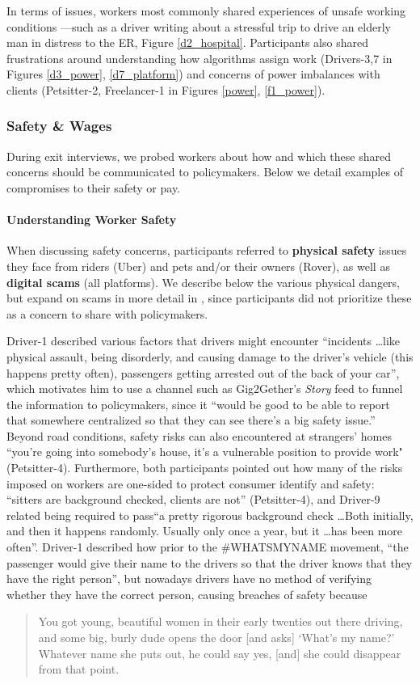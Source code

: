 In terms of issues, workers most commonly shared experiences of unsafe working conditions ---such as a driver writing about a stressful trip to drive an elderly man in distress to the ER, Figure \ref{d2_hospital}. 
Participants also shared frustrations around understanding how algorithms assign work (Drivers-3,7 in Figures \ref{d3_power}, \ref{d7_platform}) and concerns of power imbalances with clients (Petsitter-2, Freelancer-1 in Figures \ref{power}, \ref{f1_power}).

\subsubsection{{Safety \& Wages}} 

{During exit interviews, we probed workers about how and which these shared concerns should be communicated to policymakers.} Below we detail examples of compromises to their safety or pay. 

\paragraph{\textbf{Understanding Worker Safety}}
When discussing safety concerns, participants referred to \textbf{physical safety} issues they face from riders (Uber) and pets and/or their owners (Rover), as well as \textbf{digital scams} (all platforms). We describe below the various physical dangers, but expand on scams in more detail in , since participants did not prioritize these as a concern to share with policymakers.

Driver-1 described various factors that drivers might encounter ``incidents \dots like physical assault, being disorderly, and causing damage to the driver's vehicle (this happens pretty often), passengers getting arrested out of the back of your car'', which motivates him to use a channel such as Gig2Gether's \textit{Story} feed to funnel the information to policymakers, since it ``would be good to be able to report that somewhere centralized so that they can see there's a big safety issue.''
Beyond road conditions, safety risks can also encountered at strangers' homes ``you're going into somebody's house, it's a vulnerable position to provide work" (Petsitter-4). Furthermore, both participants pointed out how many of the risks imposed on workers are one-sided to protect consumer identify and safety: ``sitters are background checked, clients are not'' (Petsitter-4), and Driver-9 related being required to pass``a pretty rigorous background check \dots Both initially, and then it happens randomly. Usually only once a year, but it \dots has been more often''. Driver-1 described how prior to the \#WHATSMYNAME movement, ``the passenger would give their name to the drivers so that the driver knows that they have the right person'', but nowadays drivers have no method of verifying whether they have the correct person, causing breaches of safety because 
\begin{quote}
    You got young, beautiful women in their early twenties out there driving, and some big, burly dude opens the door [and asks] `What's my name?' Whatever name she puts out, he could say yes, [and] she could disappear from that point.
\end{quote}

